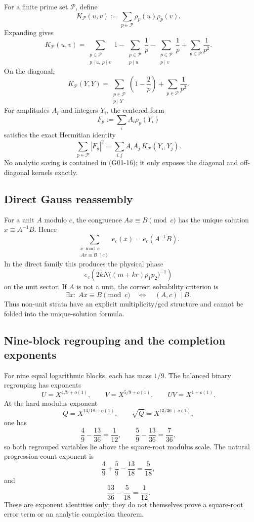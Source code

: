 \documentclass[11pt]{article}
\theoremstyle{definition}
\theoremstyle{remark}
\newcommand{\1}{\mathbf 1}
\begin{document}
For a finite prime set $\mathcal P$, define
\[
 K_{\mathcal P}(u,v):=\sum_{p\in\mathcal P}\rho_p(u)\rho_p(v).
\tag{G01-13}
\]
Expanding gives
\[
 \boxed{
 K_{\mathcal P}(u,v)
 =\sum_{\substack{p\in\mathcal P\\p\mid u,\ p\mid v}}1
 -\sum_{\substack{p\in\mathcal P\\p\mid u}}\frac1p
 -\sum_{\substack{p\in\mathcal P\\p\mid v}}\frac1p
 +\sum_{p\in\mathcal P}\frac1{p^2}.}
\tag{G01-14}
\]
On the diagonal,
\[
 K_{\mathcal P}(Y,Y)=
 \sum_{\substack{p\in\mathcal P\\p\mid Y}}\left(1-\frac2p\right)
 +\sum_{p\in\mathcal P}\frac1{p^2}.
\tag{G01-15}
\]
For amplitudes $A_i$ and integers $Y_i$, the centered form
\[
 F_p:=\sum_iA_i\rho_p(Y_i)
\]
satisfies the exact Hermitian identity
\[
 \boxed{
 \sum_{p\in\mathcal P}|F_p|^2
 =\sum_{i,j}A_i\overline{A_j}\,K_{\mathcal P}(Y_i,Y_j).}
\tag{G01-16}
\]
No analytic saving is contained in (G01-16); it only exposes the diagonal and off-diagonal kernels exactly.

\subsection{Direct Gauss reassembly}

For a unit $A$ modulo $c$, the congruence $Ax\equiv B\pmod c$ has the unique solution $x\equiv A^{-1}B$.
Hence
\[
 \boxed{
 \sum_{\substack{x\bmod c\\Ax\equiv B\ (c)}}e_c(x)=e_c(A^{-1}B).}
\tag{G01-17}
\]
In the direct family this produces the physical phase
\[
 e_c\!\left(2kN\bigl((m+kr)p_1p_2\bigr)^{-1}\right)
\tag{G01-18}
\]
on the unit sector.  If $A$ is not a unit, the correct solvability criterion is
\[
 \boxed{\exists x:\ Ax\equiv B\pmod c\quad\Longleftrightarrow\quad (A,c)\mid B.}
\tag{G01-19}
\]
Thus non-unit strata have an explicit multiplicity/gcd structure and cannot be folded into the unique-solution
formula.

\subsection{Nine-block regrouping and the completion exponents}

For nine equal logarithmic blocks, each has mass $1/9$.  The balanced binary regrouping has exponents
\[
 U=X^{4/9+o(1)},\qquad V=X^{5/9+o(1)},\qquad UV=X^{1+o(1)}.
\tag{G01-20}
\]
At the hard modulus exponent
\[
 Q=X^{13/18+o(1)},\qquad \sqrt Q=X^{13/36+o(1)},
\tag{G01-21}
\]
one has
\[
 \frac49-\frac{13}{36}=\frac1{12},
 \qquad
 \frac59-\frac{13}{36}=\frac7{36},
\tag{G01-22}
\]
so both regrouped variables lie above the square-root modulus scale.  The natural progression-count exponent is
\[
 \frac49+\frac59-\frac{13}{18}=\frac5{18},
\tag{G01-23}
\]
and
\[
 \frac{13}{36}-\frac5{18}=\frac1{12}.
\tag{G01-24}
\]
These are exponent identities only; they do not themselves prove a square-root error term or an analytic
completion theorem.
\end{document}
